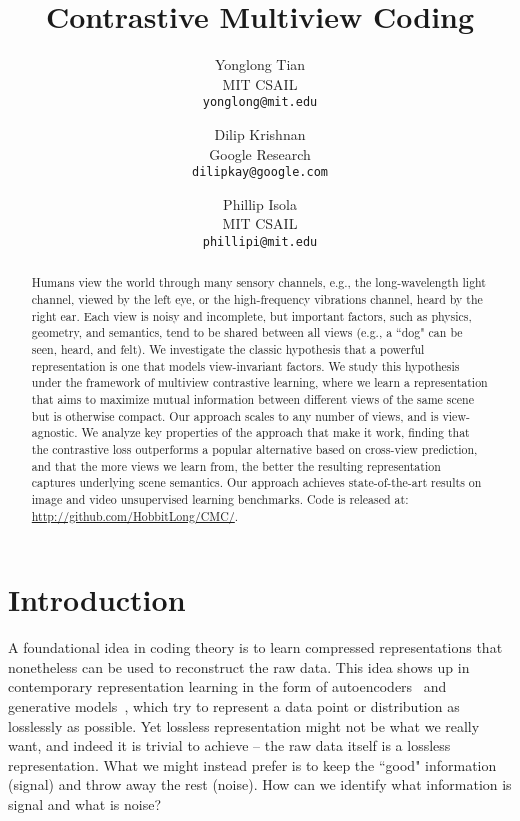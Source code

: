 \documentclass[10pt,twocolumn,letterpaper]{article}
\begin{document}
\title{Contrastive Multiview Coding}

\author{Yonglong Tian\\
MIT CSAIL\\
{\tt\small yonglong@mit.edu}
\and
Dilip Krishnan\\
Google Research\\
{\tt\small dilipkay@google.com}
\and
Phillip Isola\\
MIT CSAIL\\
{\tt\small phillipi@mit.edu}
}

\maketitle

\begin{abstract}

\vspace{-1pt}

Humans view the world through many sensory channels, e.g., the long-wavelength light channel, viewed by the left eye, or the high-frequency vibrations channel, heard by the right ear. Each view is noisy and incomplete, but important factors, such as physics, geometry, and semantics, tend to be shared between all views (e.g., a ``dog" can be seen, heard, and felt). We investigate the classic hypothesis that a powerful representation is one that models view-invariant factors. We study this hypothesis under the framework of multiview contrastive learning, where we learn a representation that aims to maximize mutual information between different views of the same scene but is otherwise compact. Our approach scales to any number of views, and is view-agnostic. We analyze key properties of the approach that make it work, finding that the contrastive loss outperforms a popular alternative based on cross-view prediction, and that the more views we learn from, the better the resulting representation captures underlying scene semantics. Our approach achieves state-of-the-art results on image and video unsupervised learning benchmarks. Code is released at: \small{\url{http://github.com/HobbitLong/CMC/}}.


\end{abstract} 
\vspace{-4mm}
\section{Introduction}

A foundational idea in coding theory is to learn compressed representations that nonetheless can be used to reconstruct the raw data. This idea shows up in contemporary representation learning in the form of autoencoders~\cite{salakhutdinov2009deep} and generative models~\cite{kingma2013auto,goodfellow2014generative}, which try to represent a data point or distribution as losslessly as possible. Yet lossless representation might not be what we really want, and indeed it is trivial to achieve -- the raw data itself is a lossless representation. What we might instead prefer is to keep the ``good" information (signal) and throw away the rest (noise). How can we identify what information is signal and what is noise?
\end{document}

